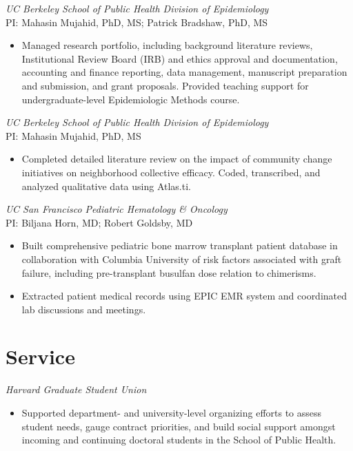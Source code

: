 \documentclass{cv_style}
\begin{document}
\textit{UC Berkeley School of Public Health Division of Epidemiology} \\
PI: Mahasin Mujahid, PhD, MS; Patrick Bradshaw, PhD, MS
\begin{itemize}
    \item Managed research portfolio, including background literature reviews, Institutional Review Board (IRB) and ethics approval and documentation, accounting and finance reporting, data management, manuscript preparation and submission, and grant proposals. Provided teaching support for undergraduate-level Epidemiologic Methods course.
\end{itemize}

\textit{UC Berkeley School of Public Health Division of Epidemiology} \\
PI: Mahasin Mujahid, PhD, MS
\begin{itemize}
    \item Completed detailed literature review on the impact of community change initiatives on neighborhood collective efficacy. Coded, transcribed, and analyzed qualitative data using Atlas.ti.
\end{itemize}

\textit{UC San Francisco Pediatric Hematology \& Oncology} \\
PI: Biljana Horn, MD; Robert Goldsby, MD
\begin{itemize}
    \item Built comprehensive pediatric bone marrow transplant patient database in collaboration with Columbia University of risk factors associated with graft failure, including pre-transplant busulfan dose relation to chimerisms.
    \item \parskip 1pt Extracted patient medical records using EPIC EMR system and coordinated lab discussions and meetings.
\end{itemize}



\section{Service}

\textit{Harvard Graduate Student Union}
\begin{itemize}
    \item Supported department- and university-level organizing efforts to assess student needs, gauge contract priorities, and build social support amongst incoming and continuing doctoral students in the School of Public Health. 
\end{itemize}
\end{document}
